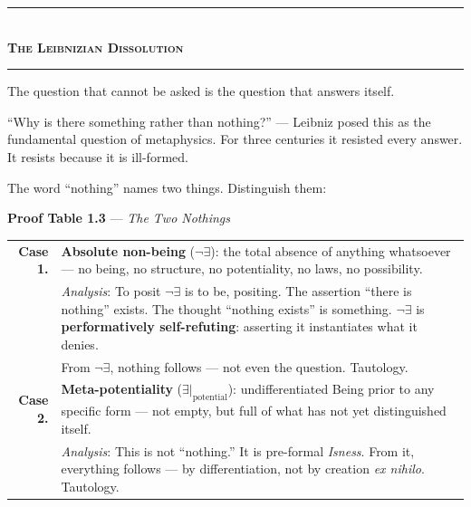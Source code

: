 \documentclass[10pt, openany, oneside]{book}
\renewcommand{\normalsize}{\fontsize{10}{13}\selectfont}
\begin{document}

\begin{center}
    \rule{0.3\textwidth}{0.4pt}\\[0.5em]
    {\normalsize\bfseries\scshape The Leibnizian Dissolution}\\[0.3em]
    \rule{0.3\textwidth}{0.4pt}
\end{center}

\vspace{1em}

\noindent The question that cannot be asked is the question that answers itself.

``Why is there something rather than nothing?'' --- Leibniz posed this as the fundamental question of metaphysics. For three centuries it resisted every answer. It resists because it is ill-formed.

The word ``nothing'' names two things. Distinguish them:

\vspace{0.5em}

\textbf{Proof Table 1.3} --- \textit{The Two Nothings}

\vspace{0.5em}

\noindent\begin{tabular}{r p{}}
\textbf{Case 1.} & \textbf{Absolute non-being} ($\neg\exists$): the total absence of anything whatsoever --- no being, no structure, no potentiality, no laws, no possibility. \\[0.3em]
 & \textit{Analysis}: To posit $\neg\exists$ is to be, positing. The assertion ``there is nothing'' exists. The thought ``nothing exists'' is something. $\neg\exists$ is \textbf{performatively self-refuting}: asserting it instantiates what it denies. \\[0.3em]
 & From $\neg\exists$, nothing follows --- not even the question. Tautology. \\[0.5em]
\textbf{Case 2.} & \textbf{Meta-potentiality} ($\exists|_{\text{potential}}$): undifferentiated Being prior to any specific form --- not empty, but full of what has not yet distinguished itself. \\[0.3em]
 & \textit{Analysis}: This is not ``nothing.'' It is pre-formal \textit{Isness}. From it, everything follows --- by differentiation, not by creation \textit{ex nihilo}. Tautology. \\[0.3em]
\end{tabular}
\end{document}
